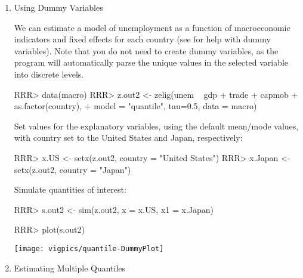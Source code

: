 \begin{enumerate}
\item Using Dummy Variables

We can estimate a model of unemployment as a function of macroeconomic indicators
and fixed effects for each country (see  for help with dummy variables). 
Note that you do not need to create dummy variables, as the program will automatically
parse the unique values in the selected variable into discrete levels.  
\begin{Schunk}
\begin{Sinput}
RRR>  data(macro)
RRR>  z.out2 <- zelig(unem ~ gdp + trade + capmob + as.factor(country), 
+                   model = "quantile", tau=0.5, data = macro)
\end{Sinput}
\end{Schunk}
Set values for the explanatory variables, using the default mean/mode
values, with country set to the United States and Japan, respectively:
\begin{Schunk}
\begin{Sinput}
RRR>  x.US <- setx(z.out2, country = "United States")
RRR>  x.Japan <- setx(z.out2, country = "Japan")
\end{Sinput}
\end{Schunk}
Simulate quantities of interest:
\begin{Schunk}
\begin{Sinput}
RRR>  s.out2 <- sim(z.out2, x = x.US, x1 = x.Japan)
\end{Sinput}
\end{Schunk}
\begin{center}
\begin{Schunk}
\begin{Sinput}
RRR>  plot(s.out2)
\end{Sinput}
\end{Schunk}
\texttt{[image: vigpics/quantile-DummyPlot]}
\end{center}

\item Estimating Multiple Quantiles


\end{enumerate}
